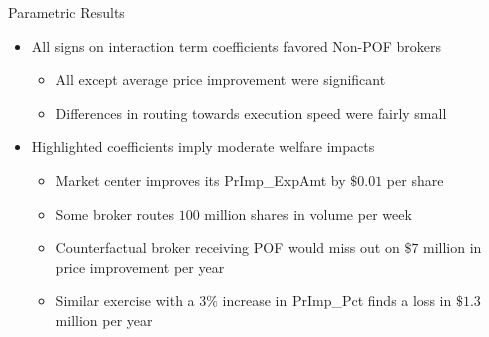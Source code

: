 \documentclass[11pt]{beamer}
\begin{document}
\begin{frame}

	
	\begin{block}
		{Parametric Results}
		\begin{itemize}
			\item All signs on interaction term coefficients favored Non-POF brokers
			\begin{itemize}
				\item All except average price improvement were significant
				\item Differences in routing towards execution speed were fairly small
			\end{itemize}
			\vspace{0.5em}
			
			\item Highlighted coefficients imply moderate welfare impacts
			
			\begin{itemize}
				\fontsize{9pt}{7}\selectfont
				\setlength\itemsep{0.4em}
				\item Market center improves its PrImp\_ExpAmt by $\$0.01$ per share
				\item Some broker routes $100$ million shares in volume per week
				\item Counterfactual broker receiving POF would miss out on $\$7$ million in price improvement per year
				\item Similar exercise with a $3\%$ increase in PrImp\_Pct finds a loss in $\$1.3$ million per year
			\end{itemize}
		\end{itemize}
	\end{block}


\end{frame}
\end{document}
